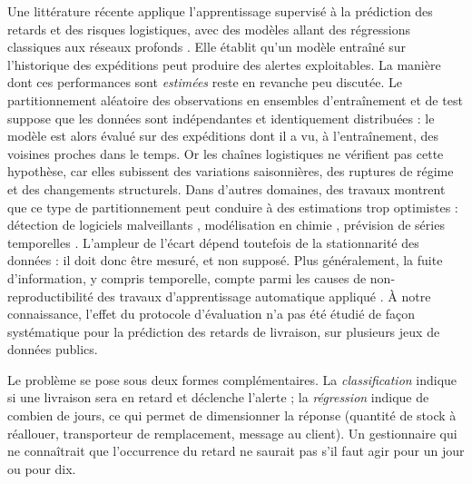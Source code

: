 \documentclass[11pt,a4paper]{article}
\theoremstyle{definition}
\begin{document}
Une littérature récente applique l'apprentissage supervisé à la prédiction des retards et des risques logistiques, avec des modèles allant des régressions classiques aux réseaux profonds \cite{rezki2024machine,douaioui2024deep,zogaan2025leveraging,widayanti2026predicting}. Elle établit qu'un modèle entraîné sur l'historique des expéditions peut produire des alertes exploitables. La manière dont ces performances sont \emph{estimées} reste en revanche peu discutée. Le partitionnement aléatoire des observations en ensembles d'entraînement et de test suppose que les données sont indépendantes et identiquement distribuées : le modèle est alors évalué sur des expéditions dont il a vu, à l'entraînement, des voisines proches dans le temps. Or les chaînes logistiques ne vérifient pas cette hypothèse, car elles subissent des variations saisonnières, des ruptures de régime et des changements structurels. Dans d'autres domaines, des travaux montrent que ce type de partitionnement peut conduire à des estimations trop optimistes : détection de logiciels malveillants \cite{pendlebury2019tesseract}, modélisation en chimie \cite{sheridan2013time}, prévision de séries temporelles \cite{cerqueira2020evaluating,hewamalage2023forecast}. L'ampleur de l'écart dépend toutefois de la stationnarité des données \cite{cerqueira2020evaluating} : il doit donc être mesuré, et non supposé. Plus généralement, la fuite d'information, y compris temporelle, compte parmi les causes de non-reproductibilité des travaux d'apprentissage automatique appliqué \cite{kapoor2023leakage,kaufman2012leakage}. À notre connaissance, l'effet du protocole d'évaluation n'a pas été étudié de façon systématique pour la prédiction des retards de livraison, sur plusieurs jeux de données publics.

Le problème se pose sous deux formes complémentaires. La \emph{classification} indique si une livraison sera en retard et déclenche l'alerte ; la \emph{régression} indique de combien de jours, ce qui permet de dimensionner la réponse (quantité de stock à réallouer, transporteur de remplacement, message au client). Un gestionnaire qui ne connaîtrait que l'occurrence du retard ne saurait pas s'il faut agir pour un jour ou pour dix.
\end{document}
